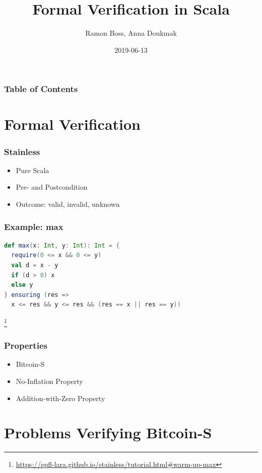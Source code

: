 \documentclass{beamer}
\newcommand\blfootnote[1]{%
  \begingroup
  \renewcommand\thefootnote{}\footnote{#1}%
  \addtocounter{footnote}{-1}%
  \endgroup
}
\begin{document}
\title{Formal Verification in Scala}
\author{Ramon Boss, Anna Doukmak}

\date{2019-06-13}

\frame{\titlepage}

\begin{frame}
  \frametitle{Table of Contents}
  \tableofcontents
\end{frame}

\section{Formal Verification}


\begin{frame}
\frametitle{Stainless}
\begin{itemize}
  \item Pure Scala
  \item Pre- and Postcondition
  \item Outcome: valid, invalid, unknown
\end{itemize}
\end{frame}


\begin{frame}[fragile]
\frametitle{Example: max}
\begin{lstlisting}[language=Scala]
def max(x: Int, y: Int): Int = {
  require(0 <= x && 0 <= y)
  val d = x - y
  if (d > 0) x
  else y
} ensuring (res =>
  x <= res && y <= res && (res == x || res == y))
\end{lstlisting}
\blfootnote{\url{https://epfl-lara.github.io/stainless/tutorial.html\#warm-up-max}}
\end{frame}


\begin{frame}
\frametitle{Properties}
\begin{itemize}
  \item Bitcoin-S
  \item No-Inflation Property
  \item Addition-with-Zero Property
\end{itemize}
\end{frame}


\section{Problems Verifying Bitcoin-S}
\end{document}

